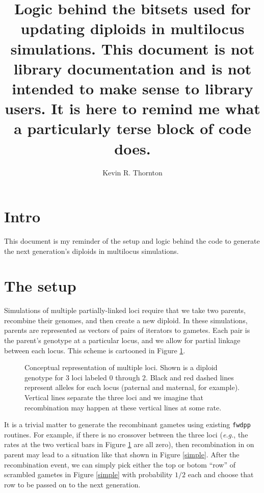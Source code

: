 \documentclass{article}
\title{Logic behind the bitsets used for updating diploids in multilocus simulations.  This document is \textbf{not} library documentation and is not intended to make sense to library users.  It is here to remind me what a particularly terse block of code does.}
\author[1]{Kevin R. Thornton}
\affil[1]{Department of Ecology and Evolutionary Biology, UC Irvine}
\date{}
\begin{document}
\maketitle
\section*{Intro}
This document is my reminder of the setup and logic behind the code to generate the next generation's diploids in multilocus simulations.
\section*{The setup}

Simulations of multiple partially-linked loci require that we take two parents, recombine their genomes, and then create a new diploid.  In these simulations, parents are represented as vectors of pairs of iterators to gametes.  Each pair is the parent's genotype at a particular locus, and we allow for partial linkage between each locus.  This scheme is cartooned in Figure \ref{concept}.

\begin{figure}[!h]
  \centering
  \caption{\label{concept}Conceptual representation of multiple loci.  Shown is a diploid genotype for 3 loci labeled 0 through 2.  Black and red dashed lines represent alleles for each locus (paternal and maternal, for example).  Vertical lines separate the three loci and we imagine that recombination may happen at these vertical lines at some rate.}
\end{figure}

It is a trivial matter to generate the recombinant gametes using existing \texttt{fwdpp} routines.  For example, if there is no crossover between the three loci (\textit{e.g.}, the rates at the two vertical bars in Figure \ref{concept} are all zero), then recombination in on parent may lead to a situation like that shown in Figure \ref{simple}.  After the recombination event, we can simply pick either the top or botom ``row'' of scrambled gametes in Figure \ref{simple} with probability $1/2$ each and choose that row to be passed on to the next generation.
  
\end{document}
